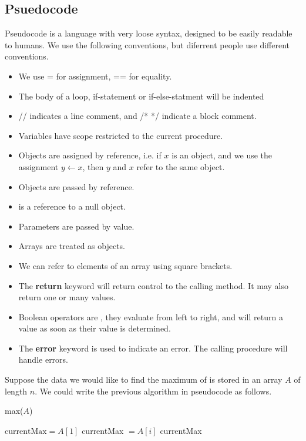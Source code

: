 \documentclass[11pt]{report}
\begin{document}
\subsection{Psuedocode}
Pseudocode is a language with very loose syntax, designed to be easily readable to humans. We use the following conventions, but diferrent people use different conventions.
\begin{itemize}
    \item We use = for assignment, == for equality. 
    \item The body of a loop, if-statement or if-else-statment will be indented
    \item // indicates a line comment, and /* */ indicate a block comment.
    \item Variables have scope restricted to the current procedure.
    \item Objects are assigned by reference, i.e. if $x$ is an object, and we use the assignment $y \gets x$, then $y$ and $x$ refer to the same object.
    \item Objects are passed by reference.
    \item {} is a reference to a null object.
    \item Parameters are passed by value.
    \item Arrays are treated as objects.
    \item We can refer to elements of an array using square brackets.
    \item The \textbf{return} keyword will return control to the calling method. It may also return one or many values.
    \item Boolean operators are , they evaluate from left to right, and will return a value as soon as their value is determined.
    \item The \textbf{error} keyword is used to indicate an error. The calling procedure will handle errors.
\end{itemize}
\begin{eg}
    Suppose the data we would like to find the maximum of is stored in an array $A$ of length $n$. We could write the previous algorithm in pseudocode as follows.
    \begin{algorithm}
        \caption{max($A$)}
        \label{alg:max}
        $\text{currentMax} = A[1]$\;
        {
            {
                currentMax $= A[i]$\; 
            }
        }
        \Return currentMax\;
    \end{algorithm}
\end{eg}
\pagebreak
\end{document}
